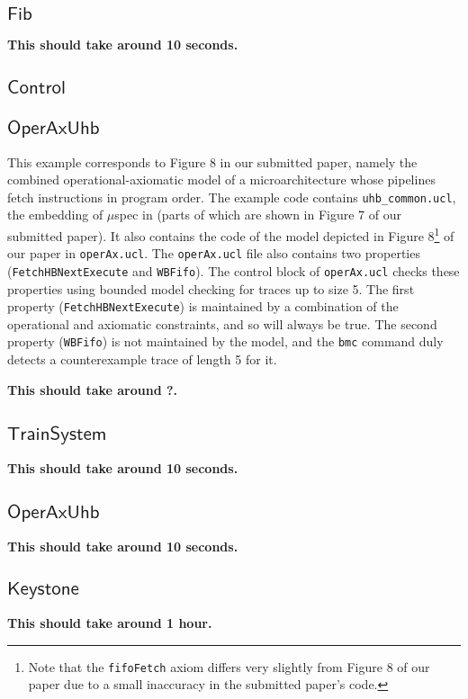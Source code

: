 \documentclass[runningheads]{llncs}
\begin{document}
\newcommand{\excommand}[1]{$\mathsf{#1}$}

\subsection{\excommand{Fib}}


\textbf{This should take around 10 seconds.}

\subsection{\excommand{Control}}

\subsection{\excommand{OperAxUhb}}

This example corresponds to Figure 8 in our submitted paper, namely the combined operational-axiomatic model of a microarchitecture whose pipelines fetch instructions in program order.
The example code contains \texttt{uhb\_common.ucl}, the embedding of $\mu$spec in \uclid (parts of which are shown in Figure 7 of our submitted paper).
It also contains the code of the model depicted in Figure 8\footnote{Note that the \texttt{fifoFetch} axiom differs very slightly from Figure 8 of our paper due to a small inaccuracy in the submitted paper's code.} of our paper in \texttt{operAx.ucl}.
The \texttt{operAx.ucl} file also contains two properties (\texttt{FetchHBNextExecute} and \texttt{WBFifo}). The control block of \texttt{operAx.ucl} checks these properties using bounded model checking for traces up to size 5.
The first property (\texttt{FetchHBNextExecute}) is maintained by a combination of the operational and axiomatic constraints, and so will always be true.
The second property (\texttt{WBFifo}) is not maintained by the model, and the \texttt{bmc} command duly detects a counterexample trace of length 5 for it.

\textbf{This should take around ?.}

\subsection{\excommand{TrainSystem}}


\textbf{This should take around 10 seconds.}

\subsection{\excommand{OperAxUhb}}


\textbf{This should take around 10 seconds.}

\subsection{\excommand{Keystone}}


\textbf{This should take around 1 hour.}
\end{document}
